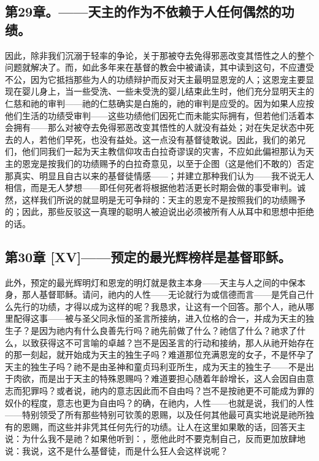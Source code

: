 
\subsection{第29章。——天主的作为不依赖于人任何偶然的功绩。}

因此，除非我们沉溺于轻率的争论，关于那被夺去免得邪恶改变其悟性之人的整个问题就解决了。而，如此多年来在基督的教会中被诵读，其中读到这句，不应遭受不公，因为它抵挡那些为人的功绩辩护而反对天主最明显恩宠的人；这恩宠主要显现在婴儿身上，当一些受洗、一些未受洗的婴儿结束此生时，他们充分显明天主的仁慈和祂的审判——祂的仁慈确实是白施的，祂的审判是应受的。因为如果人应按他们生活的功绩受审判——这些功绩他们因死亡而未能实际拥有，但若他们活着本会拥有——那么对被夺去免得邪恶改变其悟性的人就没有益处；对在失足状态中死去的人，若他们早死，也没有益处。这一点没有基督徒敢说。因此，我们的弟兄们，他们同我们一起为天主教信仰攻击白拉奇谬误的灾害，不应如此偏袒那认为天主的恩宠是按我们的功绩赐予的白拉奇意见，以至于企图（这是他们不敢的）否定那真实、明显且自古以来的基督徒情感——；并建立那种我们认为——我不说无人相信，而是无人梦想——即任何死者将根据他若活更长时期会做的事受审判。诚然，这样我们所说的就显明是无可争辩的：天主的恩宠不是按照我们的功绩赐予的；因此，那些反驳这一真理的聪明人被迫说出必须被所有人从耳中和思想中拒绝的话。\par


\subsection{第30章 [XV]——预定的最光辉榜样是基督耶稣。}

此外，预定的最光辉明灯和恩宠的明灯就是救主本身——天主与人之间的中保本身，那人基督耶稣。请问，祂内的人性——无论就行为或信德而言——是凭自己什么先行的功绩，才得以成为这样的呢？我恳求，让这有一个回答。那个人，祂从哪里配得这事——被与圣父同永恒的圣言所接纳，进入位格的合一，并成为天主的独生子？是因为祂内有什么良善先行吗？祂先前做了什么？祂信了什么？祂求了什么，以致获得这不可言喻的卓越？岂不是因圣言的行动和接纳，那人从祂开始存在的那一刻起，就开始成为天主的独生子吗？难道那位充满恩宠的女子，不是怀孕了天主的独生子吗？祂不是由圣神和童贞玛利亚所生，成为天主的独生子——不是出于肉欲，而是出于天主的特殊恩赐吗？难道要担心随着年龄增长，这人会因自由意志而犯罪吗？或者说，祂内的意志因此而不自由吗？岂不是按祂更不可能成为罪的奴仆的程度，意志也更为自由吗？的确，在祂内，人性——也就是说，我们的人性——特别领受了所有那些特别可钦羡的恩赐，以及任何其他最可真实地说是祂所独有的恩赐，而这些并非凭其任何先行的功绩。让人在这里如果敢的话，回答天主说：为什么我不是祂？如果他听到：，愿他此时不要克制自己，反而更加放肆地说：我说，这不是什么基督徒，而是什么狂人会这样说呢？\par

